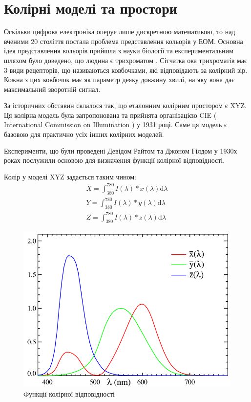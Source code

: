 \section{Колірні моделі та простори}

Оскільки цифрова електроніка оперує лише дискретною математикою, то над вченими 20 століття постала проблема представлення кольорів у ЕОМ. Основна ідея представлення кольорів прийшла з науки біології та експериментальним шляхом було доведено, що людина є трихроматом \cite{ColorSeing}. Сітчатка ока трихроматів має 3 види рецепторів, що називаються ковбочками, які відповідають за колірний зір. Кожна з цих ковбочок має як параметр деяку довжину хвилі, на яку вона дає максимальний зворотній сигнал.

За історичних обставин склалося так, що еталонним колірним простором є XYZ. Ця колірна модель була запропонована та прийнята організацією CIE ( International Commission on Illumination ) у 1931 році. Саме ця модель є базовою для практично усіх інших колірних моделей.

Експерименти, що були проведені Девідом Райтом та Джоном Гілдом у 1930х роках послужили основою для визначення функції колірної відповідності.

Колір у моделі XYZ задається таким чином:
\begin{equation}
	\begin{split}
		X = \int_{380}^{780} I(\lambda)*x(\lambda) \mathrm{d} \lambda \\
		Y = \int_{380}^{780} I(\lambda)*y(\lambda) \mathrm{d} \lambda \\
		Z = \int_{380}^{780} I(\lambda)*z(\lambda) \mathrm{d} \lambda
	\end{split}
	\label{eq:xyz}
\end{equation}


\begin{figure}[H]
	\centering
	\includegraphics[width=0.7\linewidth]{theory/img/xyz_waves}
	\caption{Функції колірної відповідності}
	\label{fig:xyz_waves}
\end{figure}

